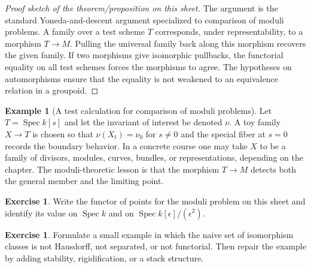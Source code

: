 \documentclass[11pt]{amsart}
\theoremstyle{definition}
\newtheorem{example}[theorem]{Example}
\newtheorem{exercise}[theorem]{Exercise}
\newcommand{\Spec}{\operatorname{Spec}}
\begin{document}
\begin{proof}[Proof sketch of the theorem/proposition on this sheet]
The argument is the standard Yoneda-and-descent argument specialized to comparison of moduli problems.  A family over a test scheme $T$ corresponds, under representability, to a morphism $T\to M$.  Pulling the universal family back along this morphism recovers the given family.  If two morphisms give isomorphic pullbacks, the functorial equality on all test schemes forces the morphisms to agree.  The hypotheses on automorphisms ensure that the equality is not weakened to an equivalence relation in a groupoid.
\end{proof}
\begin{example}[A test calculation for comparison of moduli problems]
Let $T=\Spec k[s]$ and let the invariant of interest be denoted $\nu$.  A toy family $X\to T$ is chosen so that $\nu(X_t)=\nu_0$ for $s\ne0$ and the special fiber at $s=0$ records the boundary behavior.  In a concrete course one may take $X$ to be a family of divisors, modules, curves, bundles, or representations, depending on the chapter.  The moduli-theoretic lesson is that the morphism $T\to M$ detects both the general member and the limiting point.
\end{example}
\begin{exercise}
Write the functor of points for the moduli problem on this sheet and identify its value on $\Spec k$ and on $\Spec k[\epsilon]/(\epsilon^2)$.
\end{exercise}
\begin{exercise}
Formulate a small example in which the naive set of isomorphism classes is not Hausdorff, not separated, or not functorial.  Then repair the example by adding stability, rigidification, or a stack structure.
\end{exercise}
\clearpage
\end{document}
